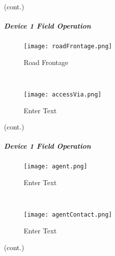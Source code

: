  {\footnotesize (cont.)}
 \vspace{.8in}


 \vspace{4in}


 \clearpage
 
 
  \subparagraph*{Device 1 Field Operation}
 \begin{wrapfigure}{r}{0.6\textwidth}
 \centering
     \texttt{[image: roadFrontage.png]}
     \vspace{-.1in}
     
 \caption{Road Frontage} 
 
 \vspace{.05in}

 \HRule \\[.4cm] %
 \vspace{.05in}
 
    \texttt{[image: accessVia.png]}
 \caption {Enter Text}
 
 \end{wrapfigure}
 
 {\footnotesize (cont.)}
 
 
  \vspace{.5in}

 
 \vspace{4in}

 
 \clearpage
 
 \subparagraph*{Device 1 Field Operation}
 \begin{wrapfigure}{r}{0.6\textwidth}
 \centering
     \texttt{[image: agent.png]}
     \vspace{-.1in}
     
 \caption{Enter Text}
 \vspace{.05in}

 \HRule \\[.4cm] %
 \vspace{.05in}

     \texttt{[image: agentContact.png]}
     \vspace{-.1in}
     
 \caption{Enter Text}
 \end{wrapfigure}
 {\footnotesize (cont.)}


